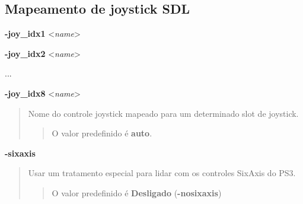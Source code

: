 \documentclass[letterpaper,10pt,brazil]{sphinxmanual}
\begin{document}
\subsection{Mapeamento de joystick SDL}
\label{commandline/sdlconfig:mapeamento-de-joystick-sdl}\label{commandline/sdlconfig:mame-scommandline-joyidx}
\begin{DUlineblock}{0em}
\item[] \textbf{-joy\_idx1} \textless{}\emph{name}\textgreater{}
\item[] \textbf{-joy\_idx2} \textless{}\emph{name}\textgreater{}
\item[] ...
\item[] \textbf{-joy\_idx8} \textless{}\emph{name}\textgreater{}
\end{DUlineblock}
\begin{quote}

Nome do controle joystick mapeado para um determinado slot de
joystick.
\begin{quote}

O valor predefinido é \textbf{auto}.
\end{quote}
\end{quote}
\label{commandline/sdlconfig:mame-scommandline-sixaxis}
\textbf{-sixaxis}
\begin{quote}

Usar um tratamento especial para lidar com os controles SixAxis do
PS3.
\begin{quote}

O valor predefinido é \textbf{Desligado} (\textbf{-nosixaxis})
\end{quote}
\end{quote}
\end{document}

